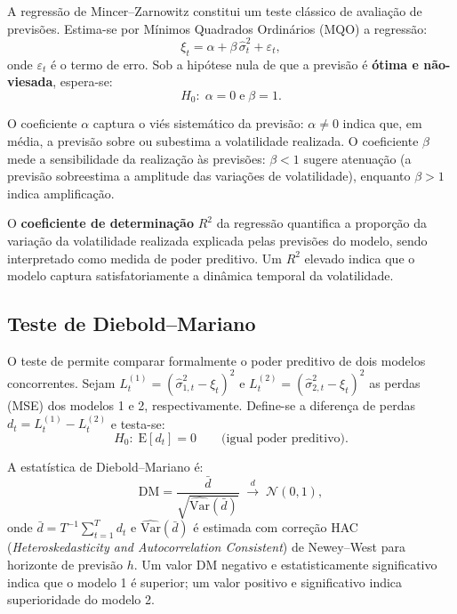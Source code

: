 A regressão de Mincer--Zarnowitz \cite{mincer1969} constitui um teste
clássico de avaliação de previsões. Estima-se por Mínimos Quadrados
Ordinários (MQO) a regressão:
%
\begin{equation}
    \label{eq:mz}
    \xi_t = \alpha + \beta\,\hat{\sigma}_t^2 + \varepsilon_t,
\end{equation}
%
onde $\varepsilon_t$ é o termo de erro. Sob a hipótese nula de que a
previsão é \textbf{ótima e não-viesada}, espera-se:
%
\begin{equation}
    \label{eq:mz_h0}
    H_0:\; \alpha = 0 \;\text{e}\; \beta = 1.
\end{equation}

O coeficiente $\alpha$ captura o viés sistemático da previsão:
$\alpha \neq 0$ indica que, em média, a previsão sobre ou subestima a
volatilidade realizada. O coeficiente $\beta$ mede a sensibilidade da
realização às previsões: $\beta < 1$ sugere atenuação (a previsão
sobreestima a amplitude das variações de volatilidade), enquanto $\beta > 1$
indica amplificação.

O \textbf{coeficiente de determinação} $R^2$ da regressão quantifica a
proporção da variação da volatilidade realizada explicada pelas previsões do
modelo, sendo interpretado como medida de poder preditivo. Um $R^2$ elevado
indica que o modelo captura satisfatoriamente a dinâmica temporal da
volatilidade.

\subsection{Teste de Diebold--Mariano}
\label{subsec:diebold_mariano}

O teste de  permite comparar formalmente o poder
preditivo de dois modelos concorrentes. Sejam
$L_t^{(1)} = (\hat{\sigma}_{1,t}^2 - \xi_t)^2$ e
$L_t^{(2)} = (\hat{\sigma}_{2,t}^2 - \xi_t)^2$ as perdas (MSE) dos modelos
1 e 2, respectivamente. Define-se a diferença de perdas
$d_t = L_t^{(1)} - L_t^{(2)}$ e testa-se:
%
\begin{equation}
    \label{eq:dm_h0}
    H_0:\; \mathrm{E}[d_t] = 0
    \qquad\text{(igual poder preditivo).}
\end{equation}

A estatística de Diebold--Mariano é:
%
\begin{equation}
    \label{eq:dm_stat}
    \text{DM} = \frac{\bar{d}}{\sqrt{\widehat{\text{Var}}(\bar{d})}}
    \;\xrightarrow{d}\; \mathcal{N}(0, 1),
\end{equation}
%
onde $\bar{d} = T^{-1}\sum_{t=1}^T d_t$ e
$\widehat{\text{Var}}(\bar{d})$ é estimada com correção HAC
(\emph{Heteroskedasticity and Autocorrelation Consistent}) de
Newey--West para horizonte de previsão $h$. Um valor DM negativo e
estatisticamente significativo indica que o modelo 1 é superior; um valor
positivo e significativo indica superioridade do modelo 2.

